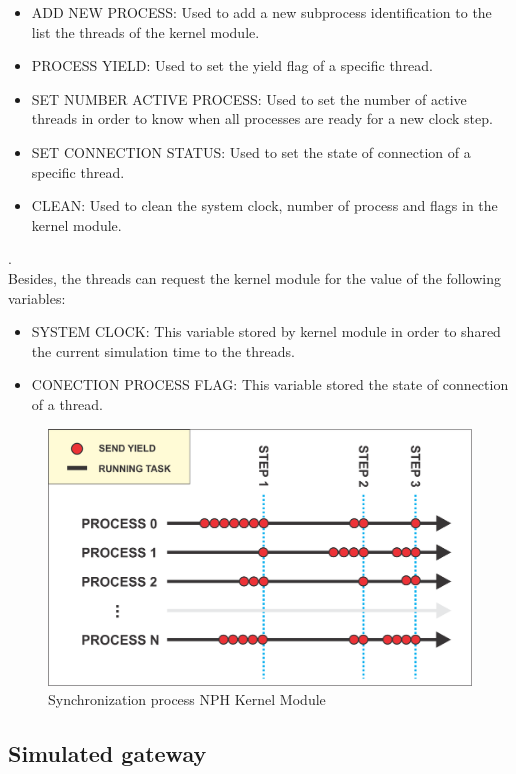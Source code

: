 \documentclass[journal]{IEEEtran}	%
\begin{document}
\begin{itemize}
    \item ADD NEW PROCESS: Used to add a new subprocess identification to the list the threads of the kernel module.
    \item PROCESS YIELD: Used to set the yield flag of a specific thread.
    \item SET NUMBER ACTIVE PROCESS: Used to set the number of active threads in order to know when all processes are ready for a new clock step.
    \item SET CONNECTION STATUS: Used to set the state of connection of a specific thread.
    \item CLEAN: Used to clean the system clock, number of process and flags in the kernel module.
\end{itemize}
.\\
Besides, the threads can request the kernel module for the value of the following variables:

\begin{itemize}
    \item SYSTEM CLOCK: This variable stored by kernel module in order to shared the current simulation time to the threads.
    \item CONECTION PROCESS FLAG: This variable stored the state of connection of a thread.
\end{itemize}

\begin{figure}[t]
\centering
\includegraphics[width=0.9\columnwidth]{KERNEL_SYNC.png}
\caption{Synchronization process NPH Kernel Module}
\label{fig:nph_kernel}
\end{figure}

\subsection{Simulated gateway}
\end{document}
